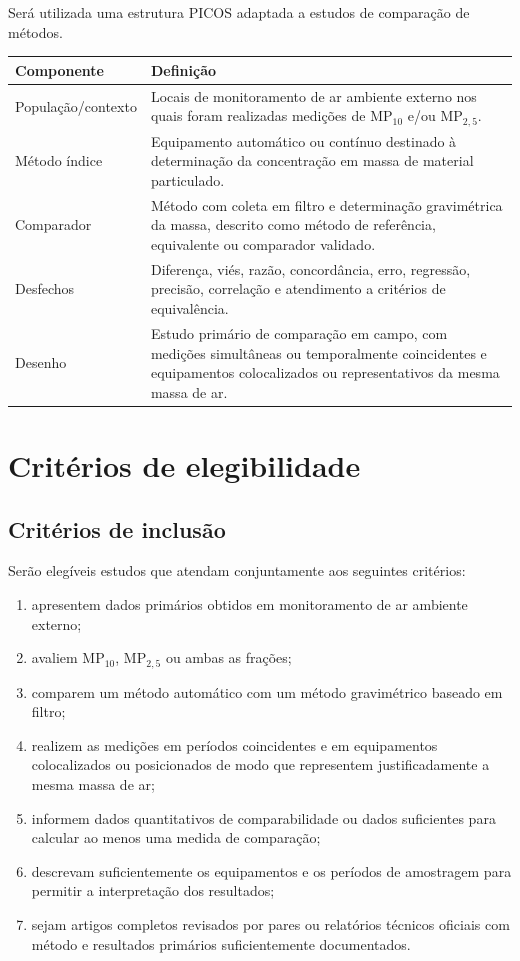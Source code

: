 \documentclass[11pt,a4paper]{article}
\newcommand{\MPdez}{MP$_{10}$}
\newcommand{\MPdoiscinco}{MP$_{2,5}$}
\begin{document}
Será utilizada uma estrutura PICOS adaptada a estudos de comparação de métodos.

\begin{longtable}{@{}p{3.6cm}p{10.9cm}@{}}
\toprule
\textbf{Componente} & \textbf{Definição} \\
\midrule
\endhead
População/contexto & Locais de monitoramento de ar ambiente externo nos quais foram
realizadas medições de \MPdez{} e/ou \MPdoiscinco{}. \\
Método índice & Equipamento automático ou contínuo destinado à determinação da
concentração em massa de material particulado. \\
Comparador & Método com coleta em filtro e determinação gravimétrica da massa,
descrito como método de referência, equivalente ou comparador validado. \\
Desfechos & Diferença, viés, razão, concordância, erro, regressão, precisão,
correlação e atendimento a critérios de equivalência. \\
Desenho & Estudo primário de comparação em campo, com medições simultâneas ou
temporalmente coincidentes e equipamentos colocalizados ou representativos da mesma
massa de ar. \\
\bottomrule
\end{longtable}

\section{Critérios de elegibilidade}

\subsection{Critérios de inclusão}

Serão elegíveis estudos que atendam conjuntamente aos seguintes critérios:

\begin{enumerate}
  \item apresentem dados primários obtidos em monitoramento de ar ambiente externo;
  \item avaliem \MPdez{}, \MPdoiscinco{} ou ambas as frações;
  \item comparem um método automático com um método gravimétrico baseado em filtro;
  \item realizem as medições em períodos coincidentes e em equipamentos colocalizados
  ou posicionados de modo que representem justificadamente a mesma massa de ar;
  \item informem dados quantitativos de comparabilidade ou dados suficientes para
  calcular ao menos uma medida de comparação;
  \item descrevam suficientemente os equipamentos e os períodos de amostragem para
  permitir a interpretação dos resultados;
  \item sejam artigos completos revisados por pares ou relatórios técnicos oficiais
  com método e resultados primários suficientemente documentados.
\end{enumerate}
\end{document}
